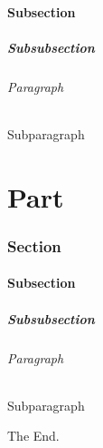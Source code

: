 \documentclass{article}
\begin{document}
    \subsection[SUBSECTION!]{Subsection}
    \kant[11-15]

    \subsubsection[SUBSUBSECTION!]{Subsubsection}
    \kant[16-20]

    \paragraph[PARAGRAPH!]{Paragraph}
    \kant[21-25]
    
    \subparagraph[SUBPARAGRAPH!]{Subparagraph}
    \kant[21-25]

    \part[A]{Part}
    \kant[26-30]

    \section[B]{Section}
    \kant[31-35]

    \subsection[C]{Subsection}
    \kant[36-40]

    \subsubsection[D]{Subsubsection}
    \kant[41-45]

    \paragraph[E]{Paragraph}
    \kant[46-50]
    
    \subparagraph[F]{Subparagraph}
    \kant[51-55]

    The End.
    
    
\end{document}
